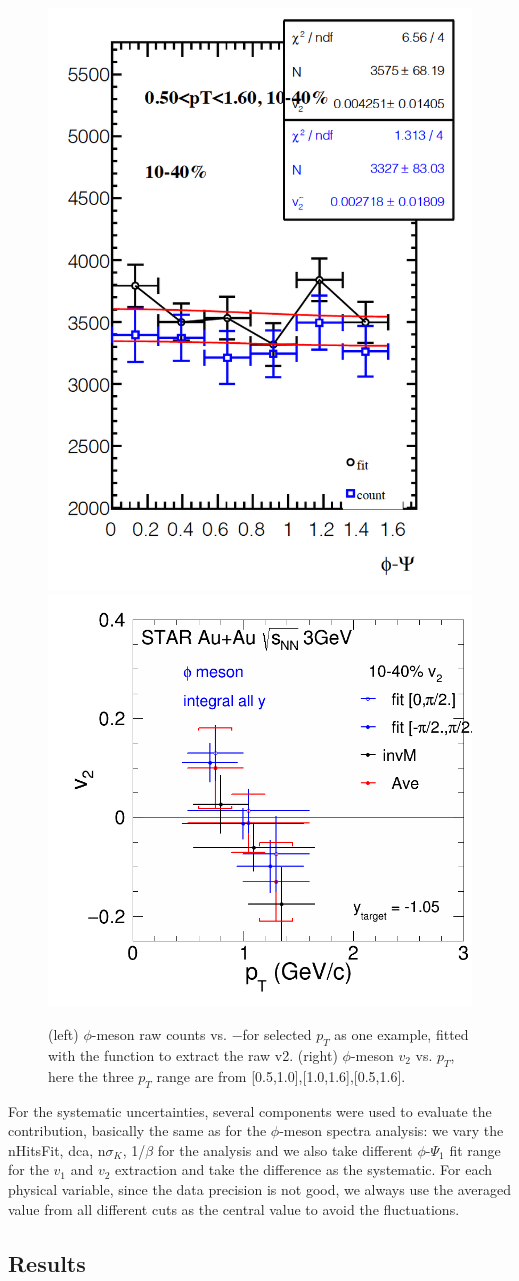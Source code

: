 \begin{figure}[h]
\includegraphics[width=0.45\linewidth]{chapterY/fig/phi_invEP_v2_10_40_fit.png}
\includegraphics[width=0.49\linewidth]{chapterY/fig/fig1_phi_v2_10_40.png}
  \caption{(left) $\phi$-meson raw counts vs. \phi$-$\Psi for selected $p_T$ as one example, fitted with the function to extract the raw v2. (right) $\phi$-meson $v_2$ vs. $p_T$, here the three $p_T$ range are from [0.5,1.0],[1.0,1.6],[0.5,1.6].}
\label{phi_v2_fit_pT}
\end{figure}

For the systematic uncertainties, several components were used to evaluate the contribution, basically the same as for the $\phi$-meson spectra analysis: we vary the nHitsFit, dca, n$\sigma_{K}$, 1/$\beta$ for the analysis and we also take different $\phi$-$\Psi_{1}$ fit range for the $v_1$ and $v_2$ extraction and take the difference as the systematic. For each physical variable, since the data precision is not good, we always use the averaged value from all different cuts as the central value to avoid the fluctuations. 

\subsection{Results}
